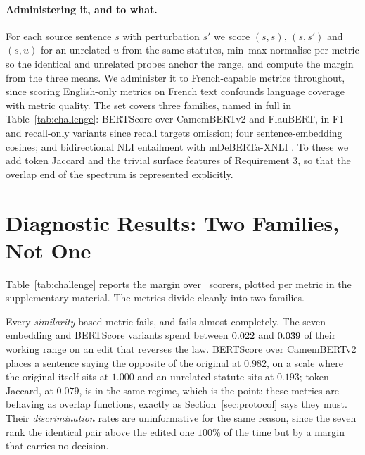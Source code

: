 \documentclass[11pt]{article}
\begin{document}
\paragraph{Administering it, and to what.}
For each source sentence $s$ with perturbation $s'$ we score $(s,s)$, $(s,s')$
and $(s,u)$ for an unrelated $u$ from the same statutes, min--max normalise per
metric so the identical and unrelated probes anchor the range, and compute the
margin from the three means. We administer it to French-capable metrics
throughout, since scoring English-only metrics on French text confounds language
coverage with metric quality. The set covers three families, named in full in
Table~\ref{tab:challenge}: BERTScore \citep{zhang2019bertscore} over CamemBERTv2
and FlauBERT, in F1 and recall-only variants since recall targets omission; four
sentence-embedding cosines; and bidirectional NLI entailment with mDeBERTa-XNLI
\citep{laurer2024nli}. To these we add token Jaccard and the trivial surface
features of Requirement 3, so that the overlap end of the spectrum is
represented explicitly.

\begin{table}[t]\centering\footnotesize

\caption{\textsc{LegalEdit}. Scores min--max normalised per metric.
\emph{discrim.} is the share of items ranked correctly (identical $>$ edited);
\emph{margin} is the fraction of the identical-to-unrelated range spent on the
legal edit. The similarity metrics rank $100\%$ of items correctly while moving
almost nothing, which is why the margin is the quantity to read.}
\label{tab:challenge}
\end{table}

\section{Diagnostic Results: Two Families, Not One}
\label{sec:results}

Table~\ref{tab:challenge} reports the margin over \nMetricsChallenged\ scorers,
plotted per metric in the supplementary material. The metrics divide cleanly
into two families.

Every \emph{similarity}-based metric fails, and fails almost completely. The
seven embedding and BERTScore variants spend between $0.022$ and
$0.039$ of their working range on an edit that reverses the law. BERTScore
over CamemBERTv2 places a sentence saying the opposite of the original at
$0.982$, on a scale where the original itself sits at $1.000$ and an unrelated
statute sits at $0.193$; token Jaccard, at $0.079$, is in the same regime, which
is the point: these metrics are behaving as overlap functions, exactly as
Section~\ref{sec:protocol} says they must. Their \emph{discrimination} rates are
uninformative for the same reason, since the seven rank the identical pair above
the edited one $100\%$ of the time but by a margin that carries no decision.
\end{document}
